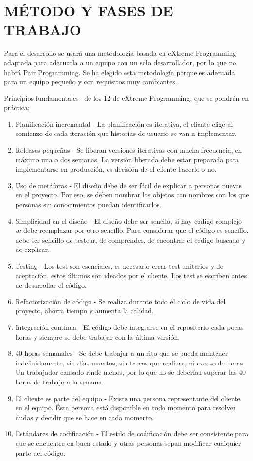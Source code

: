 \documentclass{pre-tfg}
\begin{document}
    \section{MÉTODO Y FASES DE TRABAJO}

    Para el desarrollo se usará una metodología basada en eXtreme Programming~\cite{XP} adaptada para
    adecuarla a un equipo con un solo desarrollador, por lo que no habrá Pair Programming.
    Se ha elegido esta metodología porque es adecuada para un equipo pequeño y con requisitos
    muy cambiantes.


    Principios fundamentales~\cite{XPAGIL} de los 12 de eXtreme Programming, que se pondrán en práctica:
    \begin{enumerate}
        \item Planificación incremental - La planificación es iterativa, el cliente elige al comienzo de cada
        iteración que historias de usuario se van a implementar.
        \item Releases pequeñas - Se liberan versiones iterativas con mucha frecuencia, en máximo una o dos semanas.
        La versión liberada debe estar preparada para implementarse en producción, es decisión de el cliente hacerlo
        o no.
        \item Uso de metáforas - El diseño debe de ser fácil de explicar a personas nuevas en el proyecto. Por eso,
        se deben nombrar los objetos con nombres con los que personas sin conocimientos puedan identificarlos.
        \item Simplicidad en el diseño - El diseño debe ser sencilo, si hay código complejo se debe reemplazar
        por otro sencillo. Para considerar que el código es sencillo, debe ser sencillo de testear, de comprender,
        de encontrar el código buscado y de explicar.
        \item Testing - Los test son esenciales, es necesario crear test unitarios y de aceptación, estos últimos
        son ideados por el cliente. Los test se escriben antes de desarrollar el código.
        \item Refactorización de código - Se realiza durante todo el ciclo de vida del proyecto, ahorra tiempo
        y aumenta la calidad.
        \item Integración continua - El código debe integrarse en el repositorio cada pocas horas y siempre se debe
        trabajar con la última versión.
        \item 40 horas semanales - Se debe trabajar a un rito que se pueda mantener indefinidamente, sin días muertos,
        sin tareas que realizar, ni exceso de horas. Un trabajador cansado rinde menos, por lo que no se deberían
        superar las 40 horas de trabajo a la semana.
        \item El cliente es parte del equipo - Existe una persona representante del cliente en el equipo. Ésta persona
        está disponible en todo momento para resolver dudas y decidir que se hace en cada momento.
        \item Estándares de codificación - El estilo de codificación debe ser consistente para que se encuentre en
        buen estado y otras personas sepan modificar cualquier parte del código.
    \end{enumerate}
\end{document}
